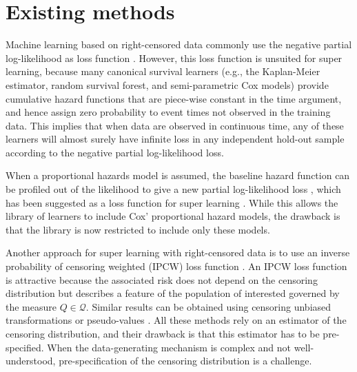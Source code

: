 \documentclass{statsoc}
\newcommand{\1}{\mathds{1}}
\begin{document}
\section{Existing methods}
\label{sec:relat-liter-exist}

Machine learning based on right-censored data commonly use the negative partial
log-likelihood as loss function
\citep[e.g.,][]{li2016regularized,yao2017deep,lee2018deephit,katzman2018deepsurv,gensheimer2019scalable,lee2021boosted,kvamme2021continuous}.
However, this loss function is unsuited for super learning, because many
canonical survival learners (e.g., the Kaplan-Meier estimator, random survival
forest, and semi-parametric Cox models) provide cumulative hazard functions that
are piece-wise constant in the time argument, and hence assign zero probability
to event times not observed in the training data. This implies that when data
are observed in continuous time, any of these learners will almost surely have
infinite loss in any independent hold-out sample according to the negative
partial log-likelihood loss.

When a proportional hazards model is assumed, the baseline hazard function can
be profiled out of the likelihood to give a new partial log-likelihood loss
\citep{cox1972regression}, which has been suggested as a loss function for super
learning \citep{golmakani2020super,verweij1993cross}. While this allows the
library of learners to include Cox' proportional hazard models, the drawback is
that the library is now restricted to include only these models.

Another approach for super learning with right-censored data is to use an
inverse probability of censoring weighted (IPCW) loss function
\citep{graf1999assessment,van2003unicv,molinaro2004tree,keles2004asymptotically,hothorn2006survival,gerds2006consistent,gonzalez2021stacked}.
An IPCW loss function is attractive because the associated risk does not depend
on the censoring distribution but describes a feature of the population of
interested governed by the measure \( Q \in \mathcal{Q} \). Similar results can
be obtained using censoring unbiased transformations
\citep{fan1996local,steingrimsson2019censoring} or pseudo-values
\citep{andersen2003generalised,mogensen2013random,sachs2019ensemble}. All these
methods rely on an estimator of the censoring distribution, and their drawback
is that this estimator has to be pre-specified. When the data-generating
mechanism is complex and not well-understood, pre-specification of the censoring
distribution is a challenge.
\end{document}
